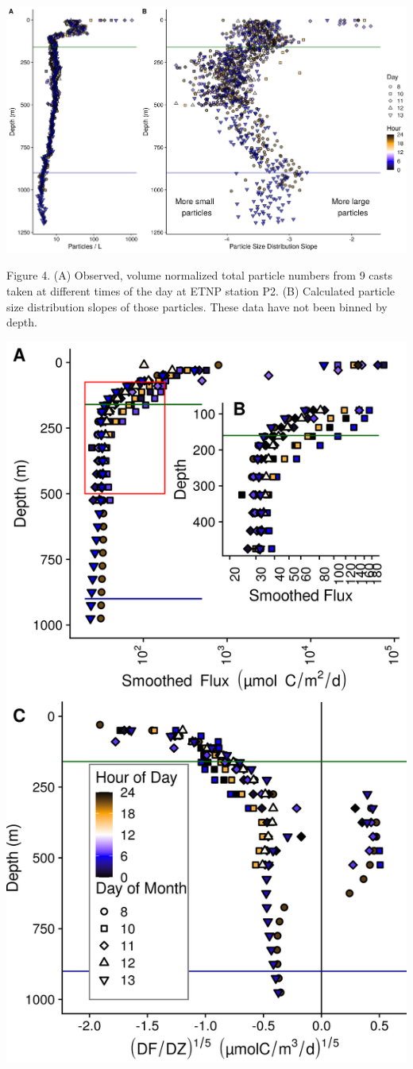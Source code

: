 \documentclass[]{article}
\begin{document}
\includegraphics{../figures/ParticlesPSDMany.png}

Figure 4. (A) Observed, volume normalized total particle numbers from 9
casts taken at different times of the day at ETNP station P2. (B)
Calculated particle size distribution slopes of those particles. These
data have not been binned by depth.

\includegraphics{../figures/FluxDeepDive.png}
\end{document}

